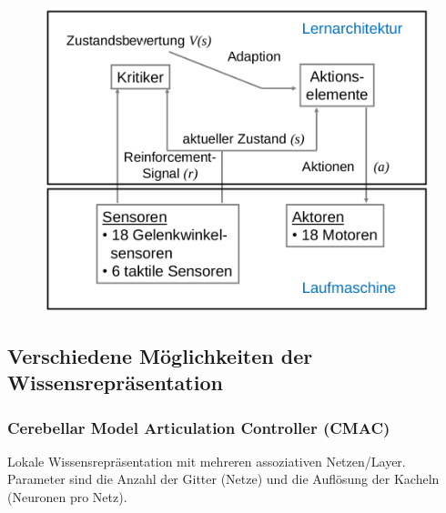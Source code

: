 \begin{figure}
	\centering
	\includegraphics[width=.7\textwidth]{figures/lernarchitektur.png}
\end{figure}

\subsection{Verschiedene Möglichkeiten der Wissensrepräsentation}

\subsubsection{Cerebellar Model Articulation Controller (CMAC)}
Lokale Wissensrepräsentation mit mehreren assoziativen Netzen/Layer. Parameter sind die Anzahl der Gitter (Netze) und die Auflösung der Kacheln (Neuronen pro Netz).

